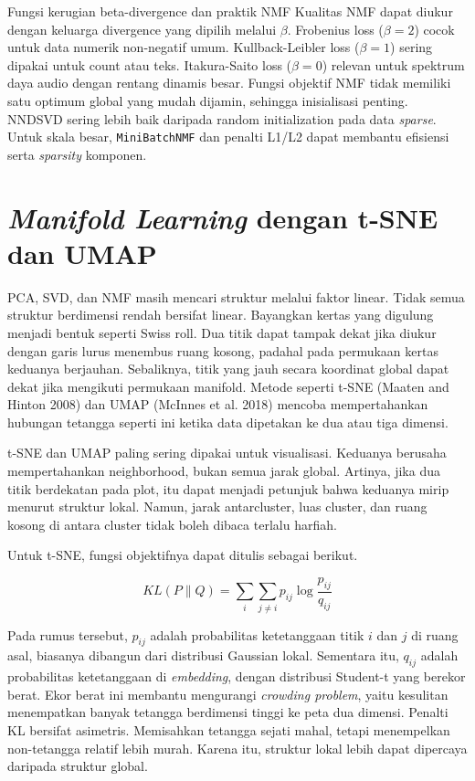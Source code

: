 \begin{pendalaman}{Fungsi kerugian beta-divergence dan praktik NMF}
Kualitas NMF dapat diukur dengan keluarga divergence yang dipilih melalui \(\beta\). Frobenius loss (\(\beta = 2\)) cocok untuk data numerik non-negatif umum. Kullback-Leibler loss (\(\beta = 1\)) sering dipakai untuk count atau teks. Itakura-Saito loss (\(\beta = 0\)) relevan untuk spektrum daya audio dengan rentang dinamis besar. Fungsi objektif NMF tidak memiliki satu optimum global yang mudah dijamin, sehingga inisialisasi penting. NNDSVD sering lebih baik daripada random initialization pada data \emph{sparse}. Untuk skala besar, \passthrough{\lstinline!MiniBatchNMF!} dan penalti L1/L2 dapat membantu efisiensi serta \emph{sparsity} komponen.
\end{pendalaman}

\section{\texorpdfstring{\emph{Manifold Learning} dengan t-SNE dan UMAP}{Manifold Learning dengan t-SNE dan UMAP}}\label{manifold-learning-dengan-t-sne-dan-umap}

PCA, SVD, dan NMF masih mencari struktur melalui faktor linear. Tidak semua struktur berdimensi rendah bersifat linear. Bayangkan kertas yang digulung menjadi bentuk seperti Swiss roll. Dua titik dapat tampak dekat jika diukur dengan garis lurus menembus ruang kosong, padahal pada permukaan kertas keduanya berjauhan. Sebaliknya, titik yang jauh secara koordinat global dapat dekat jika mengikuti permukaan manifold. Metode seperti t-SNE (Maaten and Hinton 2008) dan UMAP (McInnes et al. 2018) mencoba mempertahankan hubungan tetangga seperti ini ketika data dipetakan ke dua atau tiga dimensi.

t-SNE dan UMAP paling sering dipakai untuk visualisasi. Keduanya berusaha mempertahankan neighborhood, bukan semua jarak global. Artinya, jika dua titik berdekatan pada plot, itu dapat menjadi petunjuk bahwa keduanya mirip menurut struktur lokal. Namun, jarak antarcluster, luas cluster, dan ruang kosong di antara cluster tidak boleh dibaca terlalu harfiah.

Untuk t-SNE, fungsi objektifnya dapat ditulis sebagai berikut.

\[
KL(P \parallel Q) = \sum_i \sum_{j \neq i} p_{ij} \log \dfrac{p_{ij}}{q_{ij}}
\]

Pada rumus tersebut, \(p_{ij}\) adalah probabilitas ketetanggaan titik \(i\) dan \(j\) di ruang asal, biasanya dibangun dari distribusi Gaussian lokal. Sementara itu, \(q_{ij}\) adalah probabilitas ketetanggaan di \emph{embedding}, dengan distribusi Student-t yang berekor berat. Ekor berat ini membantu mengurangi \emph{crowding problem}, yaitu kesulitan menempatkan banyak tetangga berdimensi tinggi ke peta dua dimensi. Penalti KL bersifat asimetris. Memisahkan tetangga sejati mahal, tetapi menempelkan non-tetangga relatif lebih murah. Karena itu, struktur lokal lebih dapat dipercaya daripada struktur global.


